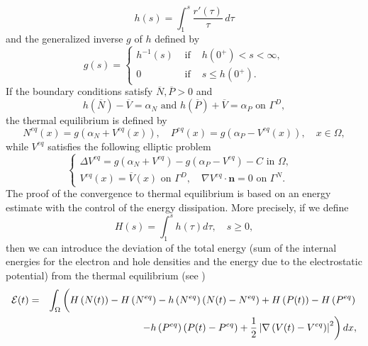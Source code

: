 \documentclass[smallextended]{svjour3}
\begin{document}
\begin{equation}
h(s)=\int_{1}^{s}\frac{r'(\tau)}{\tau}\, d\tau
\label{h}
\end{equation}
and the generalized inverse $g$ of $h$ defined by
\begin{equation*}
g(s)=\left\{ \begin{array}{rcl} h^{-1}(s) &\text{ if }& h(0^{+})<s<\infty,\\ 0 &\text{ if }& s \leq h(0^{+}).\end{array}\right.
\end{equation*}
If the boundary conditions satisfy $\overline{N},\overline{P}>0$ and
\begin{equation*}
h(\overline{N})-\overline{V}=\alpha_{N} \text{ and } h(\overline{P})+\overline{V}=\alpha_{P} \text{ on } \Gamma^{D},
\end{equation*}
the thermal equilibrium is defined by
\begin{equation}
N^{eq}(x)=g\left(\alpha_{N}+V^{eq}(x)\right), \quad P^{eq}(x)=g\left(\alpha_{P}-V^{eq}(x)\right), \quad x \in \Omega,
\label{eqNP}
\end{equation}
while $V^{eq}$ satisfies the following elliptic problem
\begin{equation}
\left\{\begin{array}{ll} \Delta V^{eq}=g\left(\alpha_{N}+V^{eq}\right)-g\left(\alpha_{P}-V^{eq}\right)-C \text{   in } \Omega, &\\
V^{eq}(x)=\overline{V}(x) \text{ on } \Gamma^{D}, \quad \nabla V^{eq}\cdot \mathbf{n}=0 \text{ on } \Gamma^{N}.&\end{array}\right.
\label{eqV}
\end{equation}
The proof of the convergence to thermal equilibrium is based on an energy estimate with the control of the energy dissipation. More precisely, if we define 
\begin{equation}
H(s)=\int_{1}^{s}h(\tau)d\tau, \quad s \geq 0,
\label{H}
\end{equation}
then we can introduce the deviation of the total energy (sum of the internal energies for the electron and hole densities and the energy due to the electrostatic potential) from the thermal equilibrium (see \cite{Juengel1995a})
\begin{eqnarray}
\mathcal{E}(t)&=&\int_{\Omega}\left(\vphantom{\frac{1}{2}}H\left(N(t)\right)-H\left(N^{eq}\right)-h\left(N^{eq}\right)\left(N(t)-N^{eq}\right)+H\left(P(t)\right)-H\left(P^{eq}\right)\right. \nonumber\\
& & \quad \left. -h\left(P^{eq}\right)\left(P(t)-P^{eq}\right) +\frac{1}{2}\left\vert \nabla \left(V(t)-V^{eq}\right)\right\vert^{2}\right)dx,
\label{Econtinusc}
\end{eqnarray}
\end{document}
